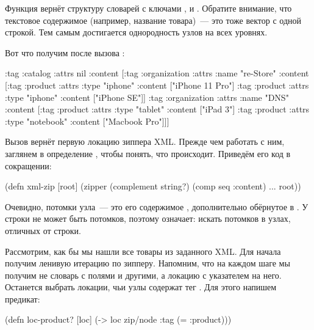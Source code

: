 Функция  вернёт структуру словарей с ключами ,
 и . Обратите внимание, что текстовое содержимое
(например, название товара)~--- это тоже вектор с одной строкой. Тем самым
достигается однородность узлов на всех уровнях.

Вот что получим после вызова :

\begin{english}
  \begin{clojure}
{:tag :catalog
 :attrs nil
 :content
 [{:tag :organization
   :attrs {:name "re-Store"}
   :content
   [{:tag :product
     :attrs {:type "iphone"}
     :content ["iPhone 11 Pro"]}
    {:tag :product
     :attrs {:type "iphone"}
     :content ["iPhone SE"]}]}
  {:tag :organization
   :attrs {:name "DNS"}
   :content
   [{:tag :product
     :attrs {:type "tablet"}
     :content ["iPad 3"]}
    {:tag :product
     :attrs {:type "notebook"}
     :content ["Macbook Pro"]}]}]}
  \end{clojure}
\end{english}

Вызов  вернёт первую локацию зиппера
XML. Прежде чем работать с ним, заглянем в определение , чтобы
понять, что происходит. Приведём его код в сокращении:

\begin{english}
  \begin{clojure}
(defn xml-zip [root]
  (zipper (complement string?)
          (comp seq :content)
          ...
          root))
  \end{clojure}
\end{english}

Очевидно, потомки узла~--- это его содержимое , дополнительно обёрнутое
в . У строки не может быть потомков, поэтому 
означает: искать потомков в узлах, отличных от строки.

Рассмотрим, как бы мы нашли все товары из заданного XML. Для начала получим
ленивую итерацию по зипперу. Напомним, что на каждом шаге мы получим не словарь
с полями  и другими, а локацию с указателем на него. Останется
выбрать локации, чьи узлы содержат тег . Для этого напишем
предикат:

\begin{english}
  \begin{clojure}
(defn loc-product?
  [loc]
  (-> loc zip/node :tag (= :product)))
  \end{clojure}
\end{english}

